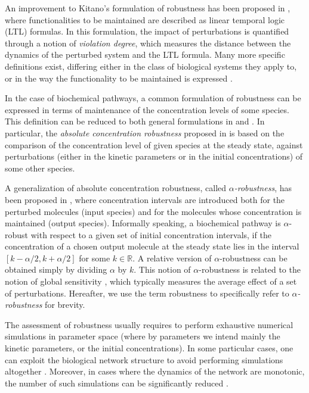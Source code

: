 An improvement to Kitano's formulation of robustness has been proposed in \citep{rizk2009general}, where functionalities to be maintained are described as linear temporal logic (LTL) formulas. In this formulation, the impact of perturbations is quantified through a notion of \emph{violation degree}, which measures the distance between the dynamics of the perturbed system and the LTL formula. Many more specific definitions exist, differing either in the class of biological systems they apply to, or in the way the functionality to be maintained is expressed \citep{larhlimi2011robustness}.

In the case of biochemical pathways, a common formulation of robustness can be expressed in terms of maintenance of the concentration levels of some species. This definition can be reduced to both general formulations in \citep{kitano2007towards} and \cite{rizk2009general}. In particular, the \emph{absolute concentration robustness} proposed in \cite{shinar2010structural} is based on the comparison of the concentration level of given species at the steady state, against perturbations (either in the kinetic parameters or in the initial concentrations) of some other species.

A generalization of absolute concentration robustness, called \emph{$\alpha$-robustness}, has been proposed in \citep{nasti2018formalizing}, where concentration intervals are introduced both for the perturbed molecules (input species) and for the molecules whose concentration is maintained (output species). Informally speaking, a biochemical pathway is $\alpha$-robust with respect to a given set of initial concentration intervals, if the concentration of a chosen output molecule at the steady state lies in the interval $[k-\alpha/2,k+\alpha/2]$ for some $k \in \mathbb{R}$. A relative version of $\alpha$-robustness can be obtained simply by dividing $\alpha$ by $k$. This notion of $\alpha$-robustness is related to the notion of global sensitivity \citep{zi2011sensitivity}, which typically measures the average effect of a set of perturbations. Hereafter, we use the term robustness to specifically refer to \emph{$\alpha$-robustness} for brevity.

The assessment of robustness usually requires to perform exhaustive numerical simulations in parameter space \citep{rizk2009general,iooss2015review} (where by parameters we intend mainly the kinetic parameters, or the initial concentrations). In some particular cases, one can exploit the biological network structure to avoid performing simulations altogether \citep{shinar2010structural}. Moreover, in cases where the dynamics of the network are monotonic, the number of such simulations can be significantly reduced \citep{gori2019towards}.

